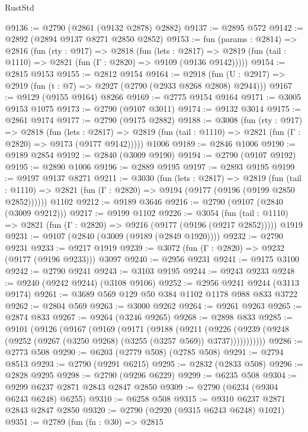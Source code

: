 \begin{lexlean}{RustStd}
\begin{coremodule}
{\begin{coremodule}
{{{{{{{{{{{{{{{{{{{{{{{{{{@9136 := @2790 (@2861 (@9132 @2878) @2882)
@9137 := @2895 @572
@9142 := @2892 (@2894 @9137 @8271 @2850 @2852)
@9153 := fun (params : @2814) =>
  @2816
    (fun (rty : @917) =>
    @2818
      (fun (lets : @2817) =>
      @2819 (fun (tail : @1110) => @2821 (fun (Γ : @2820) => @9109 (@9136 @9142)))))
@9154 := @2815 @9153
@9155 := @2812 @9154
@9164 := @2918 (fun (U : @2917) => @2919 (fun (t : @7) => @2927 (@2790 (@2933 @8268 @2808) @2944)))
@9167 := @9129 (@9155 @9164) @8266
@9169 := @2775 @9154 @9164
@9171 := @3005 @9153 @1075
@9173 := @2790 (@9107 @3011)
@9174 := @9132 @3014
@9175 := @2861 @9174
@9177 := @2790 (@9175 @2882)
@9188 := @3008
    (fun (rty : @917) =>
    @2818
      (fun (lets : @2817) =>
      @2819 (fun (tail : @1110) => @2821 (fun (Γ : @2820) => @9173 (@9177 @9142)))))
    @1006
@9189 := @2846 @1006
@9190 := @9189 @2854
@9192 := @2840 (@3009 @9190)
@9194 := @2790 (@9107 @9192)
@9195 := @2890 @1006
@9196 := @2889 @9195
@9197 := @2893 @9195
@9199 := @9197 @9137 @8271
@9211 := @3030
    (fun (lets : @2817) =>
    @2819
      (fun (tail : @1110) => @2821 (fun (Γ : @2820) => @9194 (@9177 (@9196 (@9199 @2850 @2852))))))
    @1102
@9212 := @9189 @3646
@9216 := @2790 (@9107 (@2840 (@3009 @9212)))
@9217 := @9199 @1102
@9226 := @3054
    (fun (tail : @1110) => @2821 (fun (Γ : @2820) => @9216 (@9177 (@9196 (@9217 @2852)))))
    @1919
@9231 := @9107 (@2840 (@3009 (@9189 (@2849 @1920))))
@9232 := @2790 @9231
@9233 := @9217 @1919
@9239 := @3072 (fun (Γ : @2820) => @9232 (@9177 (@9196 @9233))) @3097
@9240 := @2956 @9231
@9241 := @9175 @3100
@9242 := @2790 @9241
@9243 := @3103 @9195
@9244 := @9243 @9233
@9248 := @9240 (@9242 @9244) (@3108 @9106)
@9252 := @2956 @9241 @9244 (@3113 @9174)
@9261 := @3689 @569 @129 @50 @384 @1102 @1178 @988 @833 @3722
@9262 := @2804 @569
@9263 := @3000 @9262
@9264 := @9261 @9263
@9265 := @2874 @833
@9267 := @9264 (@3246 @9265)
@9268 := @2898 @833
@9285 := @9101
    (@9126
      (@9167
        (@9169
          (@9171
            (@9188
              (@9211
                (@9226
                  (@9239 (@9248 (@9252 (@9267 (@3250 @9268) (@3255 (@3257 @569)) @3737)))))))))))
@9286 := @2773 @508
@9290 := @6203 (@2779 @508) (@2785 @508)
@9291 := @2794 @8513
@9293 := @2790 (@9291 @6215)
@9295 := @2832 (@2833 @508)
@9296 := @2828 @9295
@9298 := @2790 (@9296 @6229)
@9299 := @6235 @508
@9304 := @9299 @6237 @2871 @2843 @2847 @2850
@9309 := @2790 (@6234 (@9304 @6243 @6248) @6255)
@9310 := @6258 @508
@9315 := @9310 @6237 @2871 @2843 @2847 @2850
@9320 := @2790 (@2920 (@9315 @6243 @6248) @1021)
@9351 := @2789
    (fun (fn : @30) =>
    @2815
}}}}}}}}}}}}}}}}}}}}}}}}}}
\end{coremodule}}
\end{coremodule}
\end{lexlean}
